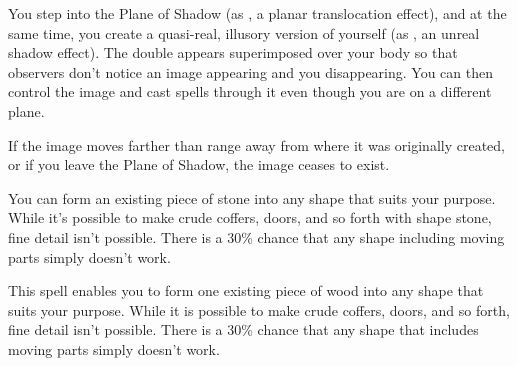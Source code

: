 \spelldur{\durmed}
\begin{spelleffect}
  You step into the Plane of Shadow (as , a planar translocation effect), and at the same time, you create a quasi-real, illusory version of yourself (as , an unreal shadow effect). The double appears superimposed over your body so that observers don't notice an image appearing and you disappearing. You can then control the image and cast spells through it even though you are on a different plane.
\end{spelleffect}
\begin{spellnotes}
  If the image moves farther than \rngfar range away from where it was originally created, or if you leave the Plane of Shadow, the image ceases to exist.
\end{spellnotes}

\begin{spelleffect}
  You can form an existing piece of stone into any shape that suits your purpose. While it's possible to make crude coffers, doors, and so forth with shape stone, fine detail isn't possible. There is a 30\% chance that any shape including moving parts simply doesn't work.
\end{spelleffect}

\begin{spelleffect}
  This spell enables you to form one existing piece of wood into any shape that suits your purpose. While it is possible to make crude coffers, doors, and so forth, fine detail isn't possible. There is a 30\% chance that any shape that includes moving parts simply doesn't work.
\end{spelleffect}

